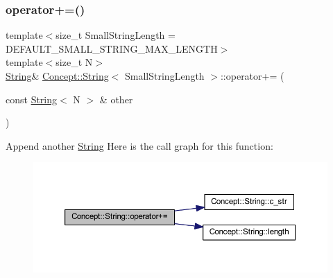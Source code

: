 \subsubsection{\texorpdfstring{operator+=()}{operator+=()}\hspace{0.1cm}{\footnotesize\ttfamily [2/2]}}
{\footnotesize\ttfamily template$<$size\+\_\+t Small\+String\+Length = D\+E\+F\+A\+U\+L\+T\+\_\+\+S\+M\+A\+L\+L\+\_\+\+S\+T\+R\+I\+N\+G\+\_\+\+M\+A\+X\+\_\+\+L\+E\+N\+G\+TH$>$ \\
template$<$size\+\_\+t N$>$ \\
\mbox{\hyperlink{class_concept_1_1_string}{String}}\& \mbox{\hyperlink{class_concept_1_1_string}{Concept\+::\+String}}$<$ Small\+String\+Length $>$\+::operator+= (\begin{DoxyParamCaption}\item[{const \mbox{\hyperlink{class_concept_1_1_string}{String}}$<$ N $>$ \&}]{other }\end{DoxyParamCaption})\hspace{0.3cm}{\ttfamily [inline]}}

Append another \mbox{\hyperlink{class_concept_1_1_string}{String}} Here is the call graph for this function\+:\nopagebreak
\begin{figure}[H]
\begin{center}
\leavevmode
\includegraphics[width=350pt]{class_concept_1_1_string_a8dbe2b6f5c9db7b4534e61c136676f41_cgraph}
\end{center}
\end{figure}
\mbox{\label{class_concept_1_1_string_a3289dc92f822852100885569f6a7bab9}} 
